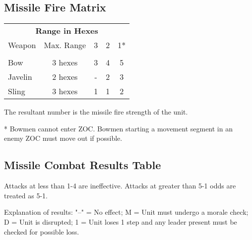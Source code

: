 \subsection{Missile Fire Matrix}

\begin{tabular}{ lcccc }
  \multicolumn{5}{c}{ \textbf{Range in Hexes}} \\
  Weapon & Max. Range & 3 & 2 & 1* \\
  \hline \\ [-2.0ex]
  Bow & 3 hexes & 3 & 4 & 5 \\
  Javelin & 2 hexes & - & 2 & 3 \\
  Sling & 3 hexes & 1 & 1 & 2 \\
  \hline
\end{tabular}
\par
The resultant number is the missile fire strength of the unit.

* Bowmen cannot enter ZOC. Bowmen starting a movement segment in an enemy ZOC must move out if possible.

\subsection{Missile Combat Results Table}

\par
Attacks at less than 1-4 are ineffective. Attacks at greater than 5-1 odds are treated as 5-1.

Explanation of results: "--" = No effect; M = Unit must undergo a morale check; D = Unit is disrupted; 1 = Unit loses 1 step and any leader present must be checked for possible loss.
